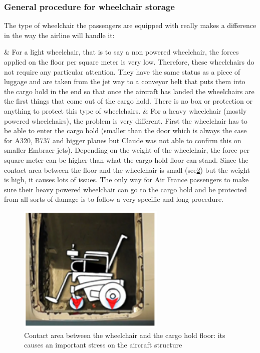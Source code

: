 \begin{figure}[h]
\centering
\label{fig:claude_monteils}
\end{figure}

\subsubsection{General procedure for wheelchair storage}
The type of wheelchair the passengers are equipped with really makes a difference in the way the airline will handle it:
\begin{easylist}[itemize]
& For a light wheelchair, that is to say a non powered wheelchair, the forces applied on the floor per square meter is very low. Therefore, these wheelchairs do not require any particular attention. They have the same status as a piece of luggage and are taken from the jet way to a conveyor belt that puts them into the cargo hold in the end so that once the aircraft has landed the wheelchairs are the first things that come out of the cargo hold. There is no box or protection or anything to protect this type of wheelchairs.
& For a heavy wheelchair (mostly powered wheelchairs), the problem is very different. First the wheelchair has to be able to enter the cargo hold (smaller than the door which is always the case for A320, B737 and bigger planes but Claude was not able to confirm this on smaller Embraer jets). Depending on the weight of the wheelchair, the force per square meter can be higher than what the cargo hold floor can stand. Since the contact area between the floor and the wheelchair is small (see\ref{fig:wheelchair_contact_area}) but the weight is high, it causes lots of issues. The only way for Air France passengers to make sure their heavy powered wheelchair can go to the cargo hold and be protected from all sorts of damage is to follow a very specific and long procedure.
\end{easylist}

\begin{figure}[h]
\centering
\includegraphics[width=7cm]{images/wheelchair_contact_area}
\caption{Contact area between the wheelchair and the cargo hold floor: its causes an important stress on the aircraft structure}
\label{fig:wheelchair_contact_area}
\end{figure}

